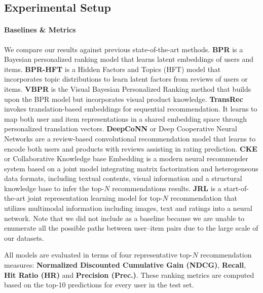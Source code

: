 \documentclass[sigconf]{acmart}
\begin{document}
\subsection{Experimental Setup}
\paragraph{Baselines \& Metrics}
We compare our results against previous state-of-the-art methods.
\textbf{BPR} \cite{rendle2009bpr} is a Bayesian personalized ranking model that learns latent embeddings of users and items.   %
\textbf{BPR-HFT} \cite{mcauley2013hidden} is a Hidden Factors and Topics (HFT) model that incorporates topic distributions to learn latent factors from reviews of users or items. %
\textbf{VBPR} \cite{he2016vbpr} is the Visual Bayesian Personalized Ranking method that builds upon the BPR model but incorporates visual product knowledge. %
\textbf{TransRec} \cite{he2017translation} invokes translation-based embeddings for sequential recommendation. It learns to map both user and item representations in a shared embedding space through personalized translation vectors. %
\textbf{DeepCoNN} or Deep Cooperative Neural Networks \cite{zheng2017joint} are a review-based convolutional recommendation model that learns to encode both users and products with reviews assisting in rating prediction.
\textbf{CKE} or Collaborative Knowledge base Embedding \cite{zhang2016collaborative} is a modern neural recommender system based on a joint model integrating matrix factorization and heterogeneous data formats, including textual contents, visual information and a structural knowledge base to infer the top-$N$ recommendations results. %
\textbf{JRL} \cite{zhang2017joint} is a start-of-the-art joint representation learning model for top-$N$ recommendation that utilizes multimodal information including images, text and ratings into a neural network.
Note that we did not include \cite{wang2018explainable} as a baseline because we are unable to enumerate all the possible paths between user--item pairs due to the large scale of our datasets.


All models are evaluated in terms of four representative top-$N$ recommendation measures: \textbf{Normalized Discounted Cumulative Gain (NDCG)}, \textbf{Recall}, \textbf{Hit Ratio (HR)} and \textbf{Precision (Prec.)}.
These ranking metrics are computed based on the top-10 predictions for every user in the test set. 

\vspace{-5pt}
\end{document}
